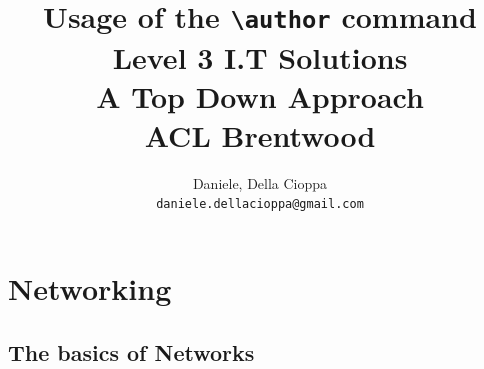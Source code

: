 \documentclass[a4paper,12pt]{book}
\author{
  Daniele, Della Cioppa\\
  \texttt{daniele.dellacioppa@gmail.com}
}
\title{Usage of the \texttt{\textbackslash author} command}
\begin{document}
\title{%
Level 3 I.T Solutions\\
\large  A Top Down Approach\\
\small ACL Brentwood}
\maketitle
\hypersetup{linkcolor=teal}
\tableofcontents
\hypersetup{linkcolor=blue}
\clearpage

\part{Networking}


\chapter{The basics of Networks}
\end{document}
